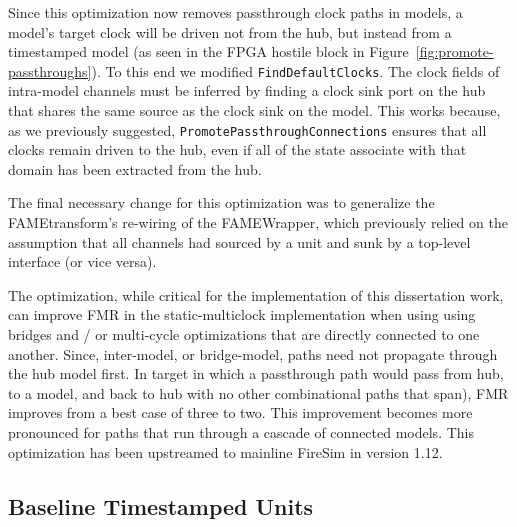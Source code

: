 
Since this optimization now removes passthrough clock paths in models, a
model's target clock will be driven not from the hub, but instead from a
timestamped model (as seen in the FPGA hostile block in
Figure~\ref{fig:promote-passthroughs}). To this end we modified
\texttt{FindDefaultClocks}. The clock fields of intra-model channels must be
inferred by finding a clock sink port on the hub that shares the same source as
the clock sink on the model. This works because, as we previously suggested,
\texttt{PromotePassthroughConnections} ensures that all clocks remain
driven to the hub, even if all of the state associate with that domain has been
extracted from the hub.

The final necessary change for this optimization was to generalize the
FAMEtransform's re-wiring of the FAMEWrapper, which previously relied on the
assumption that all channels had sourced by a unit and sunk by a top-level
interface (or vice versa).

The optimization, while critical for the implementation of this dissertation
work, can improve FMR in the static-multiclock implementation when using using
bridges and / or multi-cycle optimizations that are directly connected to one
another.  Since, inter-model, or bridge-model, paths need not propagate through
the hub model first. In target in which a passthrough path would pass from hub,
to a model, and back to hub with no other combinational paths that span), FMR
improves from a best case of three to two. This improvement becomes more
pronounced for paths that run through a cascade of connected models. This
optimization has been upstreamed to mainline FireSim in version 1.12.

\subsection{Baseline Timestamped Units}\label{sec:pdes-baseline-units}

